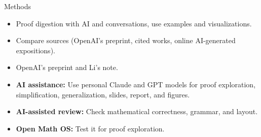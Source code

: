 \documentclass[aspectratio=169,12pt,t]{beamer}
\begin{document}
\begin{frame}[c]
  \setlength{\leftmargini}{1em}
  {Methods\par}
  \smallskip
  \begin{itemize}[<+->]
    \setlength{\itemsep}{0.55em}
    \item Proof digestion with AI and conversations, use examples and visualizations.
    \item Compare sources (OpenAI's preprint, cited works, online AI-generated expositions).
  \end{itemize}
  \vspace{0.8em}
  \smallskip
  \begin{itemize}[<+->]
    \setlength{\itemsep}{0.55em}
    \item OpenAI's preprint and Li's note.\,\cite{barnette-proof,li-note}
    \item \textbf{AI assistance:} Use personal Claude and GPT models for proof exploration, simplification, generalization, slides, report, and figures.
    \item \textbf{AI-assisted review:} Check mathematical correctness, grammar, and layout.
    \item \textbf{Open Math OS:} Test it for proof exploration.\,\cite{math-os}
  \end{itemize}
\end{frame}
\end{document}
